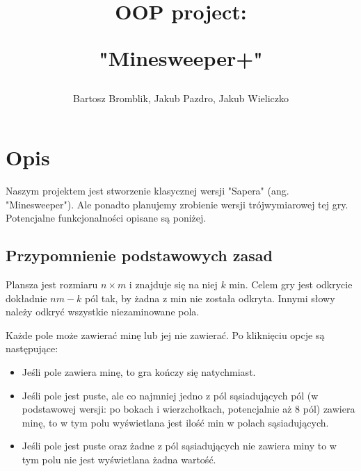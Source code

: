 \documentclass[12pt, A4]{article}
\title{OOP project: \par "Minesweeper+"}
\author{Bartosz Bromblik, Jakub Pazdro, Jakub Wieliczko}
\date{}
\begin{document}
\maketitle
\section{Opis}
Naszym projektem jest stworzenie klasycznej wersji "Sapera" (ang. "Minesweeper"). Ale ponadto planujemy zrobienie wersji trójwymiarowej tej gry. Potencjalne funkcjonalności opisane są poniżej.

\subsection{Przypomnienie podstawowych zasad}
Plansza jest rozmiaru $n \times m$ i znajduje się na niej $k$ min. Celem gry jest odkrycie dokładnie $nm-k$ pól tak, by żadna z min nie została odkryta. Innymi słowy należy odkryć wszystkie niezaminowane pola. \par
Każde pole może zawierać minę lub jej nie zawierać. Po kliknięciu opcje są następujące:
\begin{itemize}
\item Jeśli pole zawiera minę, to gra kończy się natychmiast.
\item Jeśli pole jest puste, ale co najmniej jedno z pól sąsiadujących pól (w podstawowej wersji: po bokach i wierzchołkach, potencjalnie aż 8 pól) zawiera minę, to w tym polu wyświetlana jest ilość min w polach sąsiadujących.
\item Jeśli pole jest puste oraz żadne z pól sąsiadujących nie zawiera miny to w tym polu nie jest wyświetlana żadna wartość.
\end{itemize}
\end{document}
